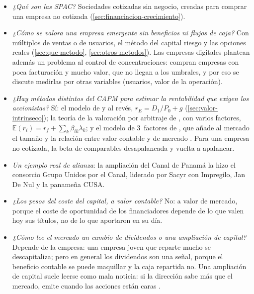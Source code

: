 \documentclass[11pt]{article}
\begin{document}
\begin{itemize}
\item \emph{¿Qué son las SPAC?} Sociedades cotizadas sin negocio, creadas para comprar una empresa no cotizada (\ref{sec:financiacion-crecimiento}).
\item \emph{¿Cómo se valora una empresa emergente sin beneficios ni flujos de caja?} Con múltiplos de ventas o de usuarios, el método del capital riesgo y las opciones reales (\ref{sec:que-metodo}, \ref{sec:otros-metodos}). Las empresas digitales plantean además un problema al control de concentraciones: compran empresas con poca facturación y mucho valor, que no llegan a los umbrales, y por eso se discute medirlas por otras variables (usuarios, valor de la operación).
\item \emph{¿Hay métodos distintos del CAPM para estimar la rentabilidad que exigen los accionistas?} Sí: el modelo de  y  al revés, $r_E=D_1/P_0+g$ (\ref{sec:valor-intrinseco}); la teoría de la valoración por arbitraje de \textcite{Ross1976Arbitrage}, con varios factores, $\mathbb{E}(r_i)=r_f+\sum_k\beta_{ik}\lambda_k$; y el modelo de 3~factores de \textcite{FamaFrench1993Common}, que añade al mercado el tamaño y la relación entre valor contable y de mercado . Para una empresa no cotizada, la beta de comparables desapalancada y vuelta a apalancar.
\item \emph{Un ejemplo real de alianza}: la ampliación del Canal de Panamá la hizo el consorcio Grupo Unidos por el Canal, liderado por Sacyr con Impregilo, Jan De Nul y la panameña CUSA\nocite{BloombergLineaGUPC}.
\item \emph{¿Los pesos del coste del capital, a valor contable?} No: a valor de mercado, porque el coste de oportunidad de los financiadores depende de lo que valen hoy sus títulos, no de lo que aportaron en su día.
\item \emph{¿Cómo lee el mercado un cambio de dividendos o una ampliación de capital?} Depende de la empresa: una empresa joven que reparte mucho se descapitaliza; pero en general los dividendos son una señal, porque el beneficio contable se puede maquillar y la caja repartida no. Una ampliación de capital suele leerse como mala noticia: si la dirección sabe más que el mercado, emite cuando las acciones están caras\nocite{Myers1984Capital} .
\end{itemize}
\end{document}
